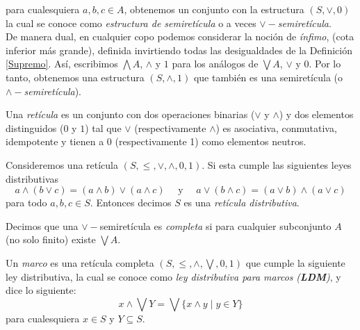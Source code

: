 para cualesquiera $a,b,c\in A$, obtenemos un conjunto con la estructura $(S, \vee, 0)$ la cual se conoce como \emph{estructura de semiretícula} o a veces \emph{$\vee-$semiretícula}.\\

De manera dual, en cualquier copo podemos considerar la noción de \emph{ínfimo}, (cota inferior más grande), definida invirtiendo todas las desigualdades de la Definición \ref{Supremo}. Así, escribimos $\bigwedge A$, $\wedge$ y $1$ para los análogos de $\bigvee A$, $\vee$ y $0$. Por lo tanto, obtenemos una  estructura $(S, \wedge, 1)$ que también es una semiretícula (o \emph{$\wedge-$semiretícula}).

\begin{dfn}\label{Reticula}
Una \emph{retícula} es un conjunto con dos operaciones binarias ($\vee$ y $\wedge$) y dos elementos distinguidos ($0$ y $1$) tal que $\vee$ (respectivamente $\wedge$) es asociativa, conmutativa, idempotente y tienen a $0$ (respectivamente 1) como elementos neutros.
\end{dfn} 

\begin{dfn}\label{Reticuladistributiva}
Consideremos una retícula $(S, \leq, \vee, \wedge, 0, 1)$. Si esta  cumple las siguientes leyes distributivas
\[
a\wedge (b\vee c)=(a\wedge b)\vee (a\wedge c)\quad\mbox{ y }\quad a\vee (b\wedge c)=(a\vee b)\wedge (a\vee c)
\]
para todo $a, b, c\in S$. Entonces decimos $S$ es una \emph{retícula distributiva}.
\end{dfn}

\begin{dfn}\label{Semiretículacompleta}
Decimos que una $\vee-$semiretícula es \emph{completa} si para cualquier subconjunto $A$ (no solo finito) existe $\bigvee A$. 
\end{dfn}

\begin{dfn}\label{frm}
Un \emph{marco} es una retícula completa $(S, \leq, \wedge, \bigvee, 0, 1)$ que cumple la siguiente ley distributiva, la cual se conoce como  \emph{ley distributiva para marcos} \emph{(\textbf{LDM})}, y dice lo siguiente:
\[
x\wedge\bigvee Y=\bigvee\{x\wedge y\mid y\in Y\}
\]
para cualesquiera $x\in S$ y $Y\subseteq S$.
\end{dfn}

